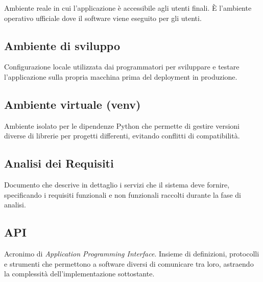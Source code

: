 \documentclass[a4paper, 11pt, oneside]{scrartcl} %
\begin{document}

Ambiente reale in cui l'applicazione è accessibile agli utenti finali. È l'ambiente operativo ufficiale dove il software viene eseguito per gli utenti.

\vspace{0.5cm}

\subsection*{Ambiente di sviluppo}


Configurazione locale utilizzata dai programmatori per sviluppare e testare l'applicazione sulla propria macchina prima del deployment in produzione.

\vspace{0.5cm}

\subsection*{Ambiente virtuale (venv)}


Ambiente isolato per le dipendenze Python che permette di gestire versioni diverse di librerie per progetti differenti, evitando conflitti di compatibilità.

\vspace{0.5cm}

\subsection*{Analisi dei Requisiti}


Documento che descrive in dettaglio i servizi che il sistema deve fornire, specificando i requisiti funzionali e non funzionali raccolti durante la fase di analisi.

\vspace{0.5cm}

\subsection*{API}
Acronimo di \textit{Application Programming Interface}. Insieme di definizioni, protocolli e strumenti che permettono a software diversi di comunicare tra loro, astraendo la complessità dell'implementazione sottostante.
\vspace{0.5cm}
\end{document}
